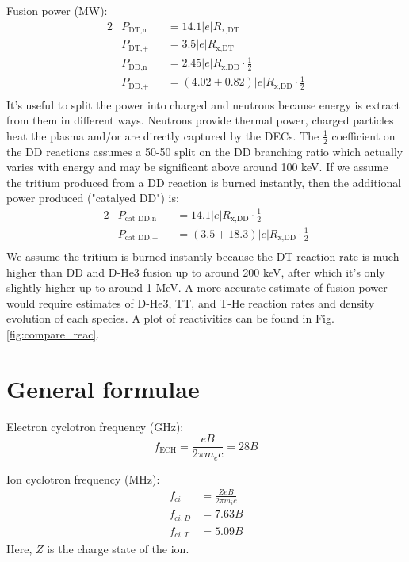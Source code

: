 Fusion power (MW):
\begin{alignat}{2}
    &P_{\text{DT,n}} &&= 14.1 |e| R_{\text{x,DT}} \\
    &P_{\text{DT,+}} &&= 3.5 |e| R_{\text{x,DT}} \\
    &P_{\text{DD,n}} &&= 2.45 |e| R_{\text{x,DD}} \cdot \frac{1}{2} \\
    &P_{\text{DD,+}} &&= \left(4.02+0.82 \right) |e| R_{\text{x,DD}} \cdot \frac{1}{2} \\
\end{alignat}
It's useful to split the power into charged and neutrons because energy is extract from them in different ways. Neutrons provide thermal power, charged particles heat the plasma and/or are directly captured by the DECs. The $\frac{1}{2}$ coefficient on the DD reactions assumes a 50-50 split on the DD branching ratio which actually varies with energy and may be significant above around 100 keV. If we assume the tritium produced from a DD reaction is burned instantly, then the additional power produced ("catalyed DD") is:
\begin{alignat}{2}
    &P_{\text{cat DD,n}} &&= 14.1|e| R_{\text{x,DD}} \cdot \frac{1}{2} \\
    &P_{\text{cat DD,+}} &&= \left(3.5+18.3 \right) |e| R_{\text{x,DD}} \cdot \frac{1}{2} \\
\end{alignat}
We assume the tritium is burned instantly because the DT reaction rate is much higher than DD and D-He3 fusion up to around 200 keV, after which it's only slightly higher up to around 1 MeV. A more accurate estimate of fusion power would require estimates of D-He3, TT, and T-He reaction rates and density evolution of each species. A plot of reactivities can be found in Fig. \ref{fig:compare_reac}. 

\section{General formulae}

Electron cyclotron frequency (GHz):
\begin{equation}
    f_{\text{ECH}} = \frac{e B}{2 \pi m_e c} = 28 B
\end{equation}

Ion cyclotron frequency (MHz):
\begin{align}
    f_{ci} &= \frac{Z e B}{2 \pi m_i c} \\
    f_{ci, D} &= 7.63 B \\
    f_{ci, T} &= 5.09 B
\end{align}
Here, $Z$ is the charge state of the ion.

